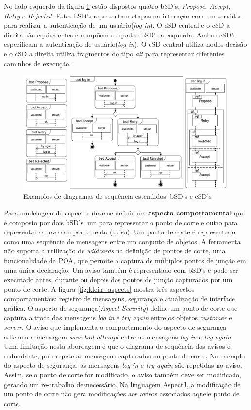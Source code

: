 No lado esquerdo da figura \ref{fig:klein_sequence_diagrams} estão dispostos quatro bSD's: \textit{Propose}, \textit{Accept}, \textit{Retry} e
\textit{Rejected}. Estes bSD's representam etapas na interação com um servidor para realizar a autenticação de um usuário(\textit{log in}). O cSD
central e o cSD a direita são equivalentes e compõem os quatro bSD's a esquerda. Ambos cSD's especificam a autenticação de usuário(\textit{log in}). O
cSD central utiliza nodos decisão e o cSD a direita utiliza fragmentos do tipo \textit{alt} para representar diferentes caminhos de execução.

\begin{figure}
	\centering
	\includegraphics[width=475px]{img/klein_sequence_diagrams.png}
	\caption{Exemplos de diagramas de sequência
	estendidos: bSD's e cSD's}\label{fig:klein_sequence_diagrams}
\end{figure}

Para modelagem de aspectos deve-se definir um \textbf{aspecto comportamental} que é composto por dois bSD's: um para representar o ponto de corte e
outro para representar o novo comportamento (aviso). Um ponto de corte é representado como uma sequência de mensagens entre um conjunto de objetos. A
ferramenta não suporta a utilização de \textit{wildcards} na definição de pontos de corte, uma funcionalidade da POA, que permite a captura
de múltiplos pontos de junção em uma única declaração. Um aviso também é representado com bSD's e pode ser executado antes, durante ou depois dos
pontos de junção capturados por um ponto de corte. A figura \ref{fig:klein_aspects} mostra três aspectos comportamentais: registro de mensagens,
segurança e atualização de interface gráfica. O aspecto de segurança(\textit{Aspect Security}) define um ponto de corte que captura a troca das
mensagens \textit{log in} e \textit{try again} entre os objetos \textit{customer} e \textit{server}. O aviso que implementa o comportamento do aspecto
de segurança adiciona a mensagem \textit{save bad attempt} entre as mensagens \textit{log in} e \textit{try again}. Uma limitação nesta abordagem é
que o diagrama de sequência dos avisos é redundante, pois repete as mensagens capturadas no ponto de corte. No exemplo do aspecto de segurança, as
mensagens \textit{log in} e \textit{try again} são repetidas no aviso. Assim, se o ponto de corte for modificado, o aviso também deve ser modificado,
gerando um re-trabalho desnecessário. Na linguagem AspectJ, a modificação de um ponto de corte não gera modificações aos avisos associados aquele
ponto de corte.

